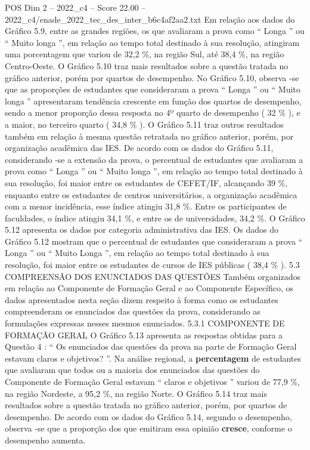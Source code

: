 \begin{textsample}{POS Dim 2 – 2022\_c4 – Score 22.00 – 2022\_c4/enade\_2022\_tec\_des\_inter\_b6c4af2aa2.txt}
Em relação aos dados do Gráfico 5.9, entre as grandes regiões, os que avaliaram a prova como “ Longa ” ou “ Muito longa ”, em relação ao tempo total destinado à sua resolução, atingiram uma porcentagem que variou de 32,2 \%, na região Sul, até 38,4 \%, na região Centro-Oeste.
O Gráfico 5.10 traz mais resultados sobre a questão tratada no gráfico anterior, porém por quartos de desempenho.
No Gráfico 5.10, observa -se que as proporções de estudantes que consideraram a prova “ Longa ” ou “ Muito longa ” apresentaram tendência crescente em função dos quartos de desempenho, sendo a menor proporção dessa resposta no 4º quarto de desempenho ( 32 \% ), e a maior, no terceiro quarto ( 34,8 \% ).
O Gráfico 5.11 traz outros resultados também em relação à mesma questão retratada no gráfico anterior, porém, por organização acadêmica das IES.
De acordo com os dados do Gráfico 5.11, considerando -se a extensão da prova, o percentual de estudantes que avaliaram a prova como “ Longa ” ou “ Muito longa ”, em relação ao tempo total destinado à sua resolução, foi maior entre os estudantes de CEFET/IF, alcançando 39 \%, enquanto entre os estudantes de centros universitários, a organização acadêmica com a menor incidência, esse índice atingiu 31,8 \%.
Entre os participantes de faculdades, o índice atingiu 34,1 \%, e entre os de universidades, 34,2 \%.
O Gráfico 5.12 apresenta os dados por categoria administrativa das IES.
Os dados do Gráfico 5.12 mostram que o percentual de estudantes que consideraram a prova “ Longa ” ou “ Muito Longa ”, em relação ao tempo total destinado à sua resolução, foi maior entre os estudantes de cursos de IES públicas ( 38,4 \% ). 5.3 COMPREENSÃO DOS ENUNCIADOS DAS QUESTÕES Também organizados em relação ao Componente de Formação Geral e ao Componente Específico, os dados apresentados nesta seção dizem respeito à forma como os estudantes compreenderam os enunciados das questões da prova, considerando as formulações expressas nesses mesmos enunciados. 5.3.1 COMPONENTE DE FORMAÇÃO GERAL O Gráfico 5.13 apresenta as respostas obtidas para a Questão 4 : “ Os enunciados das questões da prova na parte de Formação Geral estavam claros e objetivos? ”.
Na análise regional, a \textbf{percentagem} de estudantes que avaliaram que todos ou a maioria dos enunciados das questões do Componente de Formação Geral estavam “ claros e objetivos ” variou de 77,9 \%, na região Nordeste, a 95,2 \%, na região Norte.
O Gráfico 5.14 traz mais resultados sobre a questão tratada no gráfico anterior, porém, por quartos de desempenho.
De acordo com os dados do Gráfico 5.14, segundo o desempenho, observa -se que a proporção dos que emitiram essa opinião \textbf{cresce}, conforme o desempenho aumenta.

\end{textsample}
